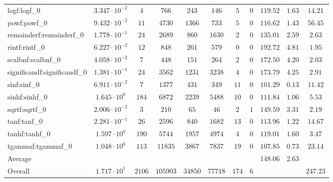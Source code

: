 \begin{tabular}{|l|c|c|c|c|c|c|c|c|c|c|}
logf:logf\_0                 & $ 3.347 \cdot 10^{-2} $ & $ 4      $ & $ 766    $ & $ 243   $ & $ 146   $ & $ 5   $ & $ 0 $ & $ 119.52      $ & $ 1.63    $ & $ 14.21   $ \\
powf:powf\_0                 & $ 9.432 \cdot 10^{-2} $ & $ 11     $ & $ 4730   $ & $ 1366  $ & $ 733   $ & $ 5   $ & $ 0 $ & $ 116.62      $ & $ 1.43    $ & $ 56.45   $ \\
remainderf:remainderf\_0     & $ 1.778 \cdot 10^{-1} $ & $ 24     $ & $ 2689   $ & $ 860   $ & $ 1630  $ & $ 2   $ & $ 0 $ & $ 135.01      $ & $ 2.59    $ & $ 2.63    $ \\
rintf:rintf\_0               & $ 6.227 \cdot 10^{-2} $ & $ 12     $ & $ 848    $ & $ 261   $ & $ 579   $ & $ 0   $ & $ 0 $ & $ 192.72      $ & $ 4.81    $ & $ 1.95    $ \\
scalbnf:scalbnf\_0           & $ 4.058 \cdot 10^{-2} $ & $ 7      $ & $ 448    $ & $ 151   $ & $ 264   $ & $ 2   $ & $ 0 $ & $ 172.50      $ & $ 4.20    $ & $ 2.03    $ \\
significandf:significandf\_0 & $ 1.381 \cdot 10^{-1} $ & $ 24     $ & $ 3562   $ & $ 1231  $ & $ 3238  $ & $ 4   $ & $ 0 $ & $ 173.79      $ & $ 4.25    $ & $ 2.91    $ \\
sinf:sinf\_0                 & $ 6.911 \cdot 10^{-2} $ & $ 7      $ & $ 1377   $ & $ 431   $ & $ 349   $ & $ 11  $ & $ 0 $ & $ 101.29      $ & $ 0.13    $ & $ 11.42   $ \\
sinhf:sinhf\_0               & $ 1.645 \cdot 10^{0}  $ & $ 184    $ & $ 6872   $ & $ 2239  $ & $ 5488  $ & $ 10  $ & $ 0 $ & $ 111.84      $ & $ 1.06    $ & $ 5.53    $ \\
sqrtf:sqrtf\_0               & $ 2.006 \cdot 10^{-2} $ & $ 3      $ & $ 210    $ & $ 65    $ & $ 46    $ & $ 2   $ & $ 1 $ & $ 149.59      $ & $ 3.31    $ & $ 2.19    $ \\
tanf:tanf\_0                 & $ 2.281 \cdot 10^{-1} $ & $ 26     $ & $ 2596   $ & $ 840   $ & $ 1682  $ & $ 13  $ & $ 0 $ & $ 113.96      $ & $ 1.22    $ & $ 14.67   $ \\
tanhf:tanhf\_0               & $ 1.597 \cdot 10^{0}  $ & $ 190    $ & $ 5744   $ & $ 1957  $ & $ 4974  $ & $ 4   $ & $ 0 $ & $ 119.01      $ & $ 1.60    $ & $ 3.47    $ \\
tgammaf:tgammaf\_0           & $ 1.048 \cdot 10^{0}  $ & $ 113    $ & $ 11835  $ & $ 3867  $ & $ 7837  $ & $ 19  $ & $ 0 $ & $ 107.85      $ & $ 0.73    $ & $ 23.14   $ \\
\hline
Average                      & $                     $ & $        $ & $        $ & $       $ & $       $ & $     $ & $   $ & $ 148.06      $ & $ 2.63    $ & $         $ \\
\hline
Overall                      & $ 1.717 \cdot 10^{1}  $ & $ 2106   $ & $ 105903 $ & $ 34850 $ & $ 77718 $ & $ 174 $ & $ 6 $ & $             $ & $         $ & $ 247.23  $ \\
\hline
\end{tabular}
